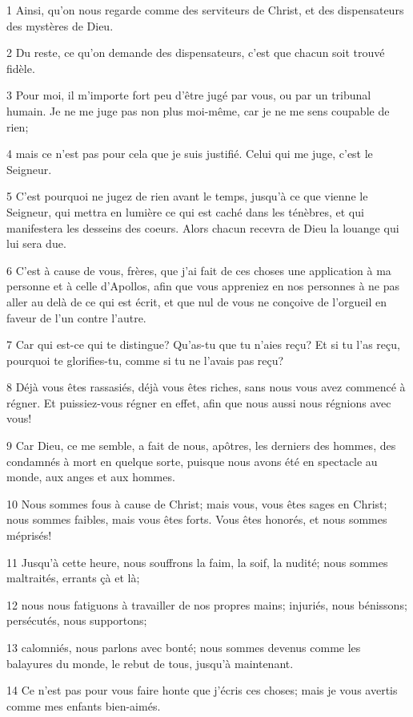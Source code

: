 \par 1 Ainsi, qu'on nous regarde comme des serviteurs de Christ, et des dispensateurs des mystères de Dieu.
\par 2 Du reste, ce qu'on demande des dispensateurs, c'est que chacun soit trouvé fidèle.
\par 3 Pour moi, il m'importe fort peu d'être jugé par vous, ou par un tribunal humain. Je ne me juge pas non plus moi-même, car je ne me sens coupable de rien;
\par 4 mais ce n'est pas pour cela que je suis justifié. Celui qui me juge, c'est le Seigneur.
\par 5 C'est pourquoi ne jugez de rien avant le temps, jusqu'à ce que vienne le Seigneur, qui mettra en lumière ce qui est caché dans les ténèbres, et qui manifestera les desseins des coeurs. Alors chacun recevra de Dieu la louange qui lui sera due.
\par 6 C'est à cause de vous, frères, que j'ai fait de ces choses une application à ma personne et à celle d'Apollos, afin que vous appreniez en nos personnes à ne pas aller au delà de ce qui est écrit, et que nul de vous ne conçoive de l'orgueil en faveur de l'un contre l'autre.
\par 7 Car qui est-ce qui te distingue? Qu'as-tu que tu n'aies reçu? Et si tu l'as reçu, pourquoi te glorifies-tu, comme si tu ne l'avais pas reçu?
\par 8 Déjà vous êtes rassasiés, déjà vous êtes riches, sans nous vous avez commencé à régner. Et puissiez-vous régner en effet, afin que nous aussi nous régnions avec vous!
\par 9 Car Dieu, ce me semble, a fait de nous, apôtres, les derniers des hommes, des condamnés à mort en quelque sorte, puisque nous avons été en spectacle au monde, aux anges et aux hommes.
\par 10 Nous sommes fous à cause de Christ; mais vous, vous êtes sages en Christ; nous sommes faibles, mais vous êtes forts. Vous êtes honorés, et nous sommes méprisés!
\par 11 Jusqu'à cette heure, nous souffrons la faim, la soif, la nudité; nous sommes maltraités, errants çà et là;
\par 12 nous nous fatiguons à travailler de nos propres mains; injuriés, nous bénissons; persécutés, nous supportons;
\par 13 calomniés, nous parlons avec bonté; nous sommes devenus comme les balayures du monde, le rebut de tous, jusqu'à maintenant.
\par 14 Ce n'est pas pour vous faire honte que j'écris ces choses; mais je vous avertis comme mes enfants bien-aimés.
